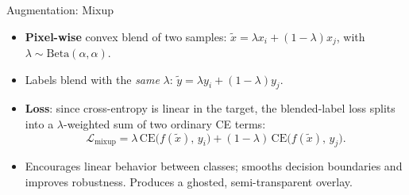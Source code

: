\begin{frame}{Augmentation: Mixup}
  \begin{center}
  \end{center}
  \vspace{0.6em}
  \begin{itemize}
    \item \textbf{Pixel-wise} convex blend of two samples: $\tilde{x}=\lambda x_i+(1{-}\lambda)x_j$, with $\lambda\sim\mathrm{Beta}(\alpha,\alpha)$.
    \item Labels blend with the \emph{same} $\lambda$: $\tilde{y}=\lambda y_i+(1{-}\lambda)y_j$.
    \item \textbf{Loss}: since cross-entropy is linear in the target, the blended-label loss splits into a $\lambda$-weighted sum of two ordinary CE terms:
      \[
        \mathcal{L}_\text{mixup} = \lambda\,\mathrm{CE}\big(f(\tilde{x}),\, y_i\big) + (1{-}\lambda)\,\mathrm{CE}\big(f(\tilde{x}),\, y_j\big).
      \]
    \item Encourages linear behavior between classes; smooths decision boundaries and improves robustness. Produces a ghosted, semi-transparent overlay.
  \end{itemize}
\end{frame}

